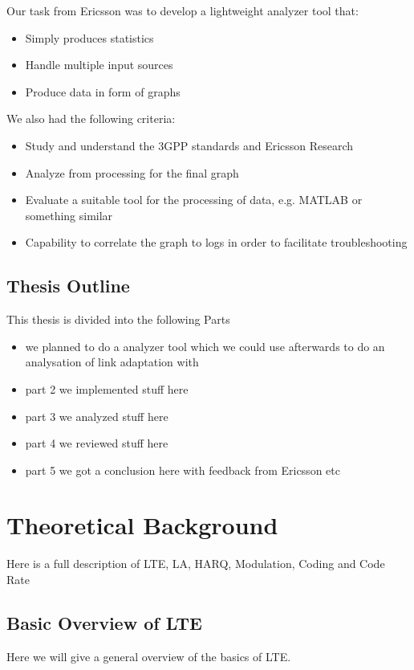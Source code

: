 \documentclass[cropmarks, frame, english]{idamasterthesis}
\begin{document}
Our task from Ericsson was to develop a lightweight analyzer tool that:
 \begin{itemize} 
 \item Simply produces statistics
 \item Handle multiple input sources
 \item Produce data in form of graphs
 \end{itemize} 

\setlength{\parindent}{0cm} We also had the following criteria: 
 \begin{itemize} 
 \item Study and understand the 3GPP standards and Ericsson Research
 \item Analyze from processing for the final graph
 \item Evaluate a suitable tool for the processing of data, e.g. MATLAB or something similar
 \item Capability to correlate the graph to logs in order to facilitate troubleshooting
 \end{itemize}


\section{Thesis Outline}
This thesis is divided into the following Parts
\begin{itemize}
	\item we planned to do a analyzer tool which we could use afterwards to do an analysation of link adaptation with
	\item part 2 we implemented stuff here
	\item part 3 we analyzed  stuff here
	\item part 4 we reviewed stuff here
	\item part 5 we got a conclusion here with feedback from Ericsson etc
\end{itemize}

\chapter{Theoretical Background}
Here is a full description of LTE, LA, HARQ, Modulation, Coding and Code Rate

\section{Basic Overview of LTE}
Here we will give a general overview of the basics of LTE.
\end{document}
